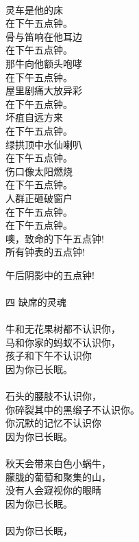 \documentclass{article}
\begin{document}
\begin{center}
\begin{minipage}{0.5\linewidth}
\end{minipage}

\newpage

\begin{minipage}{0.5\linewidth}

\Large

 \\
灵车是他的床 \\
在下午五点钟。 \\
骨与笛响在他耳边 \\
在下午五点钟。 \\
那牛向他额头咆哮 \\
在下午五点钟。 \\
屋里剧痛大放异彩 \\
在下午五点钟。 \\
坏疽自远方来 \\
在下午五点钟。 \\
绿拱顶中水仙喇叭 \\
在下午五点钟。 \\
伤口像太阳燃烧 \\
在下午五点钟。 \\
人群正砸破窗户 \\
在下午五点钟。 \\
在下午五点钟。 \\
噢，致命的下午五点钟! \\
所有钟表的五点钟! \\

\end{minipage}

\newpage

\begin{minipage}{0.5\linewidth}

\Large

午后阴影中的五点钟! \\
 \\
四 缺席的灵魂 \\
 \\
牛和无花果树都不认识你， \\
马和你家的蚂蚁不认识你， \\
孩子和下午不认识你 \\
因为你已长眠。 \\
 \\
石头的腰肢不认识你， \\
你碎裂其中的黑缎子不认识你。 \\
你沉默的记忆不认识你 \\
因为你已长眠。 \\
 \\
秋天会带来白色小蜗牛， \\
朦胧的葡萄和聚集的山， \\
没有人会窥视你的眼睛 \\
因为你已长眠。 \\
 \\
因为你已长眠， \\


\end{minipage}
\end{center}
\end{document}
